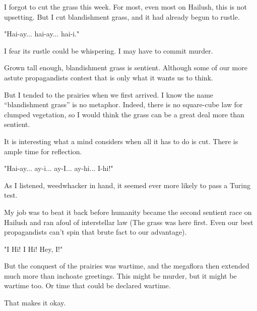 
I forgot to cut the grass this week. For most, even most on Hailush, this is not upsetting. But I cut
blandishment grass, and it had already begun to rustle.

"Hai-ay... hai-ay... hai-i."

I fear its rustle could be whispering. I may have to commit murder.

Grown tall enough, blandishment grass is sentient. Although some of our more astute
propagandists contest that is only what it wants us to think.

But I tended to the prairies when we first arrived. I know the name “blandishment grass” is no
metaphor. Indeed, there is no square-cube law for clumped vegetation, so I would think the grass can be a
great deal more than sentient.

It is interesting what a mind considers when all it has to do is cut. There is ample time for
reflection.

"Hai-ay... ay-i... ay-I... ay-hi... I-hi!"

As I listened, weedwhacker in hand, it seemed ever more likely to pass a Turing test.

My job was to beat it back before humanity became the second sentient race on Hailush and ran
afoul of interstellar law (The grass was here first. Even our best propagandists can't spin that brute fact to
our advantage).

"I Hi! I Hi! Hey, I!"

But the conquest of the prairies was wartime, and the megaflora then extended much more than
inchoate greetings. This might be murder, but it might be wartime too. Or time that could be declared
wartime.

That makes it okay.
